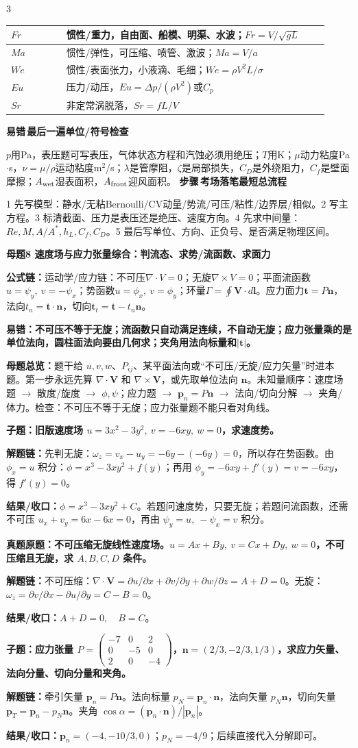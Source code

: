 \documentclass[a4paper]{article}
\newcommand{\mt}[1]{\vspace{0.22pt}\colorbox{M}{\parbox{\dimexpr\linewidth-2\fboxsep}{\color{white}\bfseries #1}}\par}
\newcommand{\qt}[1]{\vspace{0.10pt}\colorbox{Q}{\parbox{\dimexpr\linewidth-2\fboxsep}{\color{white}\bfseries #1}}\par}
\newcommand{\ans}[1]{\colorbox{G}{\parbox{\dimexpr\linewidth-2\fboxsep}{#1}}\par}
\newcommand{\warn}[1]{\colorbox{Y}{\parbox{\dimexpr\linewidth-2\fboxsep}{\color{E}\bfseries #1}}\par}
\newcommand{\chain}[1]{{\color{A}\bfseries 解题链：}#1\par}
\newcommand{\res}[1]{{\color{E}\bfseries 结果/收口：}#1\par}
\newcommand{\form}[1]{{\color{M}\bfseries 公式链：}#1\par}
\newcommand{\labtag}[3]{{\bfseries\color{#1}\colorbox{#1}{\color{white}\fontsize{2.18}{2.28}\selectfont #2}\,#3}\par}
\newcommand{\step}[1]{\labtag{S}{步骤}{#1}}
\newcommand{\err}[1]{\labtag{R}{易错}{#1}}
\newcommand{\mview}[1]{\ans{\textbf{母题总览：}#1}}
\newcommand{\stepq}[1]{\step{#1}}
\newcommand{\errq}[1]{\err{#1}}
\newenvironment{vfourWrap}{\par\begingroup\fontsize{2.66}{2.80}\selectfont\setlength{\fboxsep}{0.38pt}}{\par\endgroup}
\begin{document}
\begin{multicols}{3}
\begin{vfourWrap}
\begin{tabular}{|p{0.16\linewidth}|p{0.76\linewidth}|}
$Fr$ & 惯性/重力，自由面、船模、明渠、水波；$Fr=V/\sqrt{gL}$\\ \hline
$Ma$ & 惯性/弹性，可压缩、喷管、激波；$Ma=V/a$\\ \hline
$We$ & 惯性/表面张力，小液滴、毛细；$We=\rho V^2L/\sigma$\\ \hline
$Eu$ & 压力/动压，$Eu=\Delta p/(\rho V^2)$或$C_p$\\ \hline
$Sr$ & 非定常涡脱落，$Sr=fL/V$\\ \hline
\end{tabular}
\errq{最后一遍单位/符号检查}
$p$用Pa，表压题可写表压，气体状态方程和汽蚀必须用绝压；$T$用K；$\mu$动力粘度Pa$\cdot$s，$\nu=\mu/\rho$运动粘度m$^2$/s；$\lambda$是管摩阻，$\zeta$是局部损失，$C_D$是外绕阻力，$C_f$是壁面摩擦；$A_{\rm wet}$湿表面积，$A_{\rm front}$迎风面积。
\stepq{考场落笔最短总流程}
1 先写模型：静水/无粘Bernoulli/CV动量/势流/可压/粘性/边界层/相似。2 写主方程。3 标清截面、压力是表压还是绝压、速度方向。4 先求中间量：$Re,M,A/A^*,h_L,C_f,C_D$。5 最后写单位、方向、正负号、是否满足物理区间。
\end{vfourWrap}
\mt{母题8 速度场与应力张量综合：判流态、求势/流函数、求面力}
\form{运动学/应力链：不可压$\nabla\cdot V=0$；无旋$\nabla\times V=0$；平面流函数$u=\psi_y,\ v=-\psi_x$；势函数$u=\phi_x,\ v=\phi_y$；环量$\Gamma=\oint\bm V\cdot d\bm l$。应力面力$\bm t=P\bm n$，法向$t_n=\bm t\cdot\bm n$，切向$\bm t_t=\bm t-t_n\bm n$。}
\warn{易错：不可压不等于无旋；流函数只自动满足连续，不自动无旋；应力张量乘的是单位法向，圆柱面法向要由几何求；夹角用法向标量和$|\bm t|$。}
\mview{题干给 $u,v,w$、$P_{ij}$、某平面法向或“不可压/无旋/应力矢量”时进本题。第一步永远先算 $\nabla\cdot\bm V$ 和 $\nabla\times\bm V$，或先取单位法向 $\bm n$。未知量顺序：速度场题 $\to$ 散度/旋度 $\to$ $\phi,\psi$；应力题 $\to$ $\bm p_n=P\bm n$ $\to$ 法向/切向分解 $\to$ 夹角/体力。检查：不可压不等于无旋；应力张量题不能只看对角线。}
\qt{子题：旧版速度场 $u=3x^2-3y^2,\ v=-6xy,\ w=0$，求速度势。}
\chain{先判无旋：$\omega_z=v_x-u_y=-6y-(-6y)=0$，所以存在势函数。由 $\phi_x=u$ 积分：$\phi=x^3-3xy^2+f(y)$；再用 $\phi_y=-6xy+f'(y)=v=-6xy$，得 $f'(y)=0$。}
\res{$\phi=x^3-3xy^2+C$。若题问速度势，只要无旋；若题问流函数，还需不可压 $u_x+v_y=6x-6x=0$，再由 $\psi_y=u,\ -\psi_x=v$ 积分。}
\qt{真题原题：不可压缩无旋线性速度场。$u=Ax+By,\ v=Cx+Dy,\ w=0$，不可压缩且无旋，求 $A,B,C,D$ 条件。}
\chain{不可压缩：$\nabla\cdot\bm V=\partial u/\partial x+\partial v/\partial y+\partial w/\partial z=A+D=0$。无旋：$\omega_z=\partial v/\partial x-\partial u/\partial y=C-B=0$。}
\res{$A+D=0,\quad B=C$。}

\qt{子题：应力张量 $P=\begin{pmatrix}-7&0&2\\0&-5&0\\2&0&-4\end{pmatrix}$，$\bm n=(2/3,-2/3,1/3)$，求应力矢量、法向分量、切向分量和夹角。}
\chain{牵引矢量 $\bm p_n=P\bm n$。法向标量 $p_N=\bm p_n\cdot\bm n$，法向矢量 $p_N\bm n$，切向矢量 $\bm p_T=\bm p_n-p_N\bm n$。夹角 $\cos\alpha=(\bm p_n\cdot\bm n)/|\bm p_n|$。}
\res{$\bm p_n=(-4,-10/3,0)$；$p_N=-4/9$；后续直接代入分解即可。}


\end{multicols}
\end{document}
